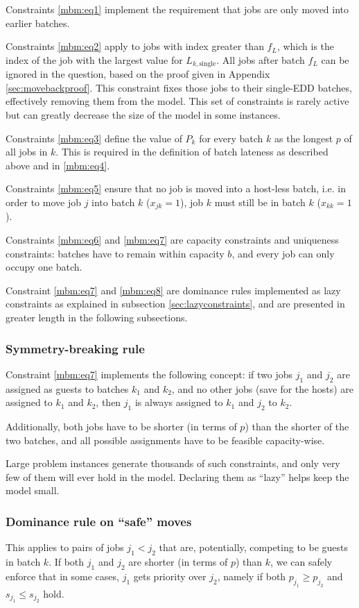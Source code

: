 \documentclass[13pt, letterpaper, oneside]{book}
\begin{document}
Constraints \eqref{mbm:eq1} implement the requirement that jobs are only moved
into earlier batches.

Constraints \eqref{mbm:eq2} apply to jobs with index greater than $f_L$, which
is the index of the job with the largest value for $L_{k,\text{single}}$. All
jobs after batch $f_L$ can be ignored in the question, based on the proof given in
Appendix \ref{sec:movebackproof}. This constraint fixes those jobs to their
single-EDD batches, effectively removing them from the model. This set of
constraints is rarely active but can greatly decrease the size of the model in
some instances.

Constraints \eqref{mbm:eq3} define the value of $P_k$ for every batch $k$ as the
longest $p$ of all jobs in $k$. This is required in the definition of batch
lateness as described above and in \eqref{mbm:eq4}.

Constraints \eqref{mbm:eq5} ensure that no job is moved into a host-less batch,
i.e. in order to move job $j$ into batch $k$ ($x_{jk} = 1$), job $k$ must still
be in batch $k$ ($x_{kk} = 1$).

Constraints \eqref{mbm:eq6} and \eqref{mbm:eq7} are capacity constraints and
uniqueness constraints: batches have to remain within capacity $b$, and every
job can only occupy one batch.

Constraint \eqref{mbm:eq7} and \eqref{mbm:eq8} are dominance rules implemented
as lazy constraints as explained
in subsection \ref{sec:lazyconstraints}, and are presented in greater length in
the following subsections.

\subsubsection{Symmetry-breaking rule}
Constraint \eqref{mbm:eq7} implements the following concept: if two jobs $j_1$
and $j_2$ are assigned as guests to batches $k_1$ and $k_2$, and no other jobs
(save for the hosts) are assigned to $k_1$ and $k_2$, then $j_1$ is always
assigned to $k_1$ and $j_2$ to $k_2$.

Additionally, both jobs have to be shorter (in terms of $p$) than the shorter of
the two batches, and all possible assignments have to be feasible capacity-wise.

Large problem instances generate thousands of such constraints, and only very
few of them will ever hold in the model. Declaring them as ``lazy'' helps keep
the model small.

\subsubsection{Dominance rule on ``safe'' moves}
This applies to pairs of jobs $j_1 < j_2$ that are, potentially, competing
to be guests in batch $k$. If both $j_1$ and $j_2$ are shorter (in terms of $p$)
than $k$, we can safely enforce that in some cases, $j_1$ gets priority over
$j_2$, namely if both $p_{j_1} \geq p_{j_2}$ and $s_{j_1} \leq s_{j_2}$ hold.
\end{document}

